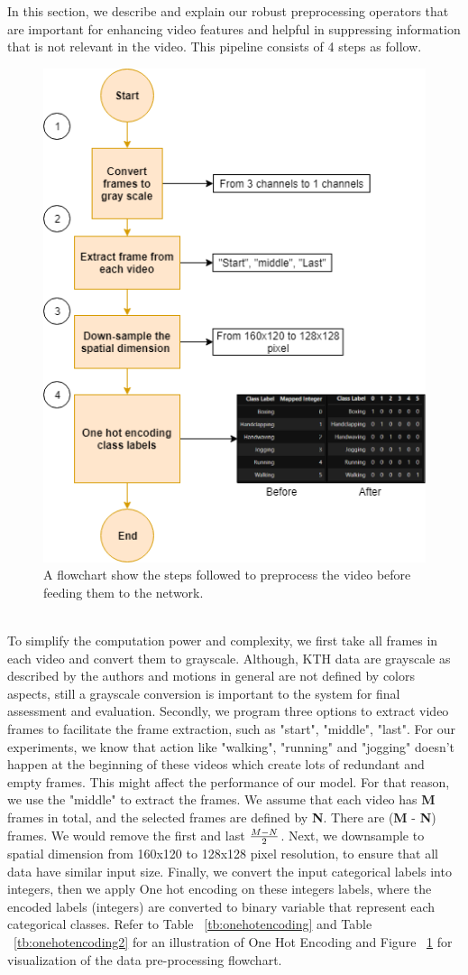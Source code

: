 In this section, we describe and explain our robust preprocessing operators that are
important for enhancing video features and helpful in suppressing information that is not relevant in the video. This pipeline consists of 4 steps as follow.\\

\begin{figure}[ht]
\centering
\includegraphics[width=0.5\columnwidth]{Chapters/photos/fc.png}
\decoRule
\caption[A flowchart show the steps followed to preprocess the video before feeding them to the network.]{A flowchart show the steps followed to preprocess the video before feeding them to the network.}
\label{fig:datapreprocessingpipeline}
\end{figure}\\

To simplify the computation power and complexity, we first take all frames in each video and convert them to grayscale. Although, KTH data are grayscale as described by the authors and motions in general are not defined by colors aspects, still a grayscale conversion is important to the system for final assessment and evaluation. Secondly, we program three options to extract video frames to facilitate the frame extraction, such as "start", "middle", "last". For our experiments, we know that action like "walking", "running" and "jogging" doesn't happen at the beginning of these videos which create lots of redundant and empty frames. This might affect the performance of our model. For that reason, we use the "middle" to extract the frames. We assume that each video has \textbf{M} frames in total, and the selected frames are defined by \textbf{N}. There are (\textbf{M} - \textbf{N}) frames. We would remove the first and last $\LARGE \frac{M-N}{2}$. Next, we downsample to spatial dimension from 160x120 to 128x128 pixel resolution, to ensure that all data have similar input size. Finally, we convert the input categorical labels into integers, then we apply One hot encoding on these integers labels, where the encoded labels (integers) are converted to binary variable that represent each categorical classes. Refer to Table ~\ref{tb:onehotencoding} and Table ~\ref{tb:onehotencoding2} for an illustration of One Hot Encoding and Figure ~\ref{fig:datapreprocessingpipeline} for visualization of the data pre-processing flowchart.

